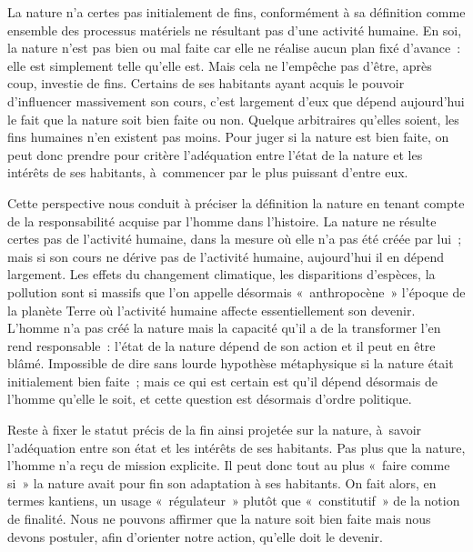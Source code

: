\documentclass[a4paper,12pt]{article}
\begin{document}
La nature n'a certes pas initialement de fins,
conformément à sa définition comme ensemble des processus matériels ne
résultant pas d'une activité humaine. En soi, la nature n'est pas bien
ou mal faite car elle ne réalise aucun plan fixé d'avance : elle est
simplement telle qu'elle est. Mais cela ne l'empêche pas d'être, après
coup, investie de fins. Certains de ses habitants ayant acquis le
pouvoir d'influencer massivement son cours,
c'est largement d'eux que dépend aujourd'hui le fait que la nature soit
bien faite ou non. Quelque arbitraires qu'elles soient, les fins
humaines n'en existent pas moins. Pour juger
si la nature est bien faite, on peut donc prendre pour critère
l'adéquation entre l'état de la nature et les intérêts de ses habitants,
à commencer par le plus puissant d'entre eux.

Cette perspective nous conduit à préciser la
définition la nature en tenant compte de la responsabilité acquise par
l'homme dans l'histoire. La nature ne résulte
certes pas de l'activité humaine, dans la mesure où elle n'a pas été
créée par lui ; mais si son cours ne dérive pas de l'activité humaine,
aujourd'hui il en dépend largement. Les effets du changement climatique,
les disparitions d'espèces, la pollution sont si massifs que l'on
appelle désormais « anthropocène » l'époque de la planète Terre où
l'activité humaine affecte essentiellement son devenir. L'homme n'a pas
créé la nature mais la capacité qu'il a de la transformer l'en rend
responsable : l'état de la nature dépend de son action et il peut en
être blâmé. Impossible de dire sans lourde hypothèse métaphysique si la
nature était initialement bien faite ; mais ce qui est
certain est qu'il dépend désormais de
l'homme qu'elle le soit, et cette question est désormais d'ordre
politique.

Reste à fixer le statut précis de la fin ainsi
projetée sur la nature, à savoir l'adéquation entre son état et les
intérêts de ses habitants. Pas plus que la nature, l'homme n'a reçu de
mission explicite. Il peut donc tout au plus « faire comme si » la
nature avait pour fin son adaptation à ses habitants. On fait alors, en
termes kantiens, un usage « régulateur » plutôt que
« constitutif » de la notion de finalité. Nous ne
pouvons affirmer que la nature soit bien
faite mais nous devons postuler, afin d'orienter notre action, qu'elle
doit le devenir.
\end{document}
